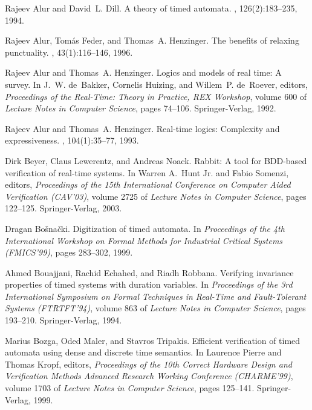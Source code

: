 \documentclass[a4paper]{article}
\theoremstyle{plain}
\theoremstyle{definition}
\begin{document}
\begin{thebibliography}{10}

Rajeev Alur and David~L. Dill.
\newblock A theory of timed automata.
, 126(2):183--235, 1994.

Rajeev Alur, Tom{\' a}s Feder, and Thomas~A. Henzinger.
\newblock The benefits of relaxing punctuality.
, 43(1):116--146, 1996.

Rajeev Alur and Thomas~A. Henzinger.
\newblock Logics and models of real time: A survey.
\newblock In J.~W. de~Bakker, Cornelis Huizing, and Willem~P. de~Roever,
  editors, {\em Proceedings of the Real-Time: Theory in Practice, REX
  Workshop}, volume 600 of {\em Lecture Notes in Computer Science}, pages
  74--106. Springer-Verlag, 1992.

Rajeev Alur and Thomas~A. Henzinger.
\newblock Real-time logics: Complexity and expressiveness.
, 104(1):35--77, 1993.

Dirk Beyer, Claus Lewerentz, and Andreas Noack.
\newblock Rabbit: A tool for {BDD}-based verification of real-time systems.
\newblock In Warren A.~Hunt Jr. and Fabio Somenzi, editors, {\em Proceedings of
  the 15th International Conference on Computer Aided Verification (CAV'03)},
  volume 2725 of {\em Lecture Notes in Computer Science}, pages 122--125.
  Springer-Verlag, 2003.

Dragan Bo{\v s}na{\v c}ki.
\newblock Digitization of timed automata.
\newblock In {\em Proceedings of the 4th International Workshop on Formal
  Methods for Industrial Critical Systems (FMICS'99)}, pages 283--302, 1999.

Ahmed Bouajjani, Rachid Echahed, and Riadh Robbana.
\newblock Verifying invariance properties of timed systems with duration
  variables.
\newblock In {\em Proceedings of the 3rd International Symposium on Formal
  Techniques in Real-Time and Fault-Tolerant Systems (FTRTFT'94)}, volume 863
  of {\em Lecture Notes in Computer Science}, pages 193--210. Springer-Verlag,
  1994.

Marius Bozga, Oded Maler, and Stavros Tripakis.
\newblock Efficient verification of timed automata using dense and discrete
  time semantics.
\newblock In Laurence Pierre and Thomas Kropf, editors, {\em Proceedings of the
  10th Correct Hardware Design and Verification Methods Advanced Research
  Working Conference (CHARME'99)}, volume 1703 of {\em Lecture Notes in
  Computer Science}, pages 125--141. Springer-Verlag, 1999.


\end{thebibliography}
\end{document}
